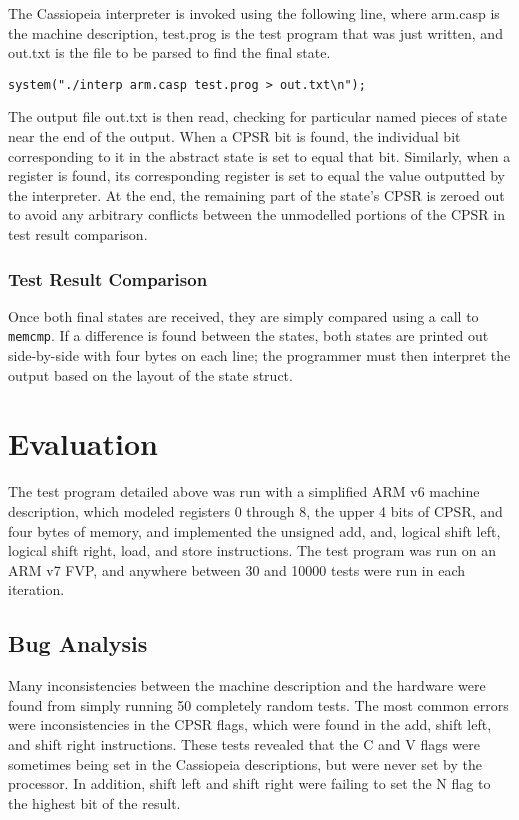 \documentclass[letterpaper,12pt]{article}
\begin{document}
The Cassiopeia interpreter is invoked using the following line, where arm.casp is the machine description, test.prog is the test program that was just written, and out.txt is the file to be parsed to find the final state.

\texttt{system("./interp arm.casp test.prog > out.txt\textbackslash n");}

The output file out.txt is then read, checking for particular named pieces of state near the end of the output. When a CPSR bit is found, the individual bit corresponding to it in the abstract state is set to equal that bit. Similarly, when a register is found, its corresponding register is set to equal the value outputted by the interpreter. At the end, the remaining part of the state's CPSR is zeroed out to avoid any arbitrary conflicts between the unmodelled portions of the CPSR in test result comparison.

\subsubsection{Test Result Comparison}

Once both final states are received, they are simply compared using a call to \texttt{memcmp}. If a difference is found between the states, both states are printed out side-by-side with four bytes on each line; the programmer must then interpret the output based on the layout of the state struct.

\section{Evaluation}

The test program detailed above was run with a simplified ARM v6 machine description, which modeled registers 0 through 8, the upper 4 bits of CPSR, and four bytes of memory, and implemented the unsigned add, and, logical shift left, logical shift right, load, and store instructions. The test program was run on an ARM v7 FVP, and anywhere between 30 and 10000 tests were run in each iteration.

\subsection{Bug Analysis}

Many inconsistencies between the machine description and the hardware were found from simply running 50 completely random tests. The most common errors were inconsistencies in the CPSR flags, which were found in the add, shift left, and shift right instructions. These tests revealed that the C and V flags were sometimes being set in the Cassiopeia descriptions, but were never set by the processor. In addition, shift left and shift right were failing to set the N flag to the highest bit of the result.
\end{document}
